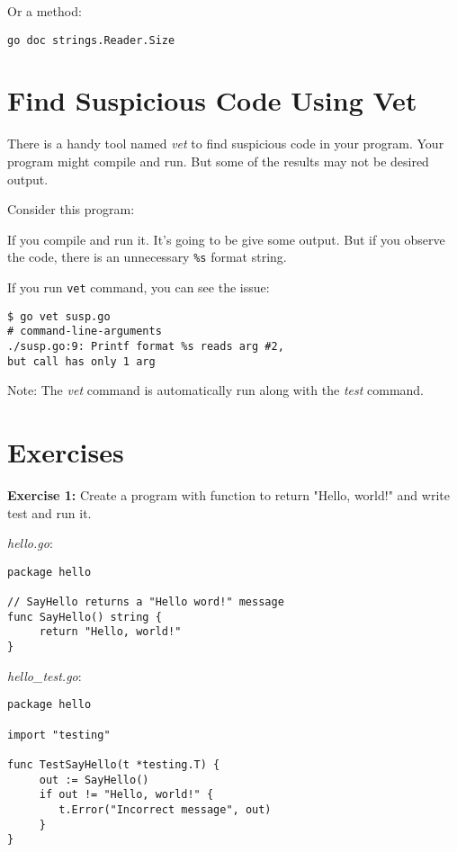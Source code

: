 Or a method:

\begin{lstlisting}[numbers=none]
go doc strings.Reader.Size
\end{lstlisting}

\section{Find Suspicious Code Using Vet}

There is a handy tool named \textit{vet} to find
suspicious code in your program.  Your program might compile and
run. But some of the results may not be desired output.

Consider this program:



If you compile and run it.  It's going to be give some output.  But if
you observe the code, there is an unnecessary \texttt{\%s} format
string.

If you run \texttt{vet} command, you can see the issue:


\begin{lstlisting}[numbers=none]
$ go vet susp.go
# command-line-arguments
./susp.go:9: Printf format %s reads arg #2,
but call has only 1 arg
\end{lstlisting}

Note: The \textit{vet} command is automatically run along with
the \textit{test} command.

\section{Exercises}

\textbf{Exercise 1:} Create a program with function to return "Hello, world!" and
write test and run it.

\textit{hello.go}:

\begin{lstlisting}[numbers=none]
package hello

// SayHello returns a "Hello word!" message
func SayHello() string {
     return "Hello, world!"
}
\end{lstlisting}

\textit{hello\_test.go}:

\begin{lstlisting}[numbers=none]
package hello

import "testing"

func TestSayHello(t *testing.T) {
     out := SayHello()
     if out != "Hello, world!" {
        t.Error("Incorrect message", out)
     }
}
\end{lstlisting}

